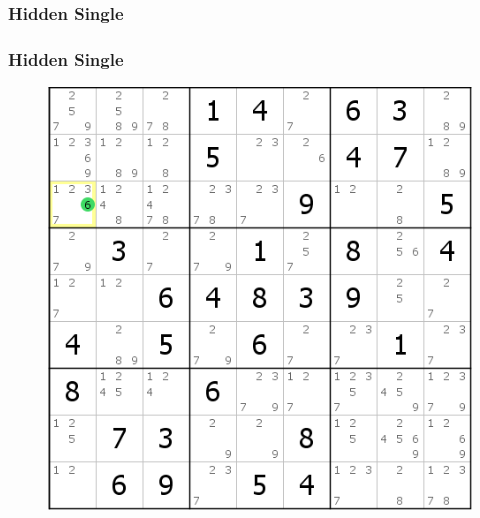 \documentclass[accentcolor=tud6b,colorbacktitle,inverttitle,landscape,german,presentation,t]{tudbeamer}
\begin{document}
		\subsubsection{Hidden Single}
			\begin{frame}
			\frametitle{Hidden Single}
			\begin{figure}[Hh]
    			\includegraphics[width=\textwidth,height=\textheight-10pt,keepaspectratio]{./img/hidden_single.png}
			\end{figure}
			\end{frame}
\end{document}
